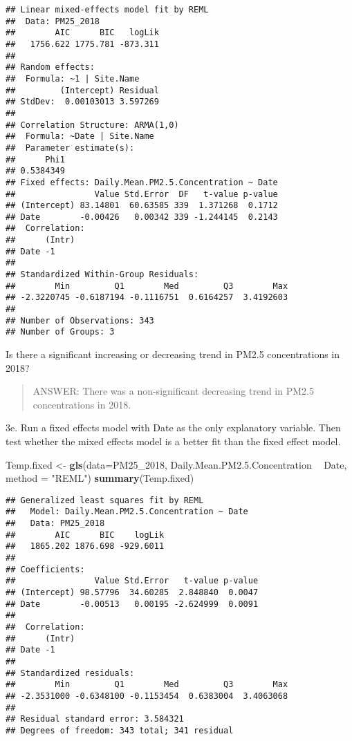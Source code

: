 \documentclass[]{article}
\newenvironment{Shaded}{\begin{snugshade}}{\end{snugshade}}
\newcommand{\KeywordTok}[1]{\textcolor[rgb]{0.13,0.29,0.53}{\textbf{#1}}}
\newcommand{\DataTypeTok}[1]{\textcolor[rgb]{0.13,0.29,0.53}{#1}}
\newcommand{\DecValTok}[1]{\textcolor[rgb]{0.00,0.00,0.81}{#1}}
\newcommand{\FloatTok}[1]{\textcolor[rgb]{0.00,0.00,0.81}{#1}}
\newcommand{\StringTok}[1]{\textcolor[rgb]{0.31,0.60,0.02}{#1}}
\newcommand{\OperatorTok}[1]{\textcolor[rgb]{0.81,0.36,0.00}{\textbf{#1}}}
\newcommand{\NormalTok}[1]{#1}
\begin{document}
\begin{verbatim}
## Linear mixed-effects model fit by REML
##  Data: PM25_2018 
##        AIC      BIC   logLik
##   1756.622 1775.781 -873.311
## 
## Random effects:
##  Formula: ~1 | Site.Name
##         (Intercept) Residual
## StdDev:  0.00103013 3.597269
## 
## Correlation Structure: ARMA(1,0)
##  Formula: ~Date | Site.Name 
##  Parameter estimate(s):
##      Phi1 
## 0.5384349 
## Fixed effects: Daily.Mean.PM2.5.Concentration ~ Date 
##                Value Std.Error  DF   t-value p-value
## (Intercept) 83.14801  60.63585 339  1.371268  0.1712
## Date        -0.00426   0.00342 339 -1.244145  0.2143
##  Correlation: 
##      (Intr)
## Date -1    
## 
## Standardized Within-Group Residuals:
##        Min         Q1        Med         Q3        Max 
## -2.3220745 -0.6187194 -0.1116751  0.6164257  3.4192603 
## 
## Number of Observations: 343
## Number of Groups: 3
\end{verbatim}

Is there a significant increasing or decreasing trend in PM2.5
concentrations in 2018?

\begin{quote}
ANSWER: There was a non-significant decreasing trend in PM2.5
concentrations in 2018.
\end{quote}

3e. Run a fixed effects model with Date as the only explanatory
variable. Then test whether the mixed effects model is a better fit than
the fixed effect model.

\begin{Shaded}
\begin{Highlighting}[]
\NormalTok{Temp.fixed <-}\StringTok{ }\KeywordTok{gls}\NormalTok{(}\DataTypeTok{data=}\NormalTok{PM25_}\DecValTok{2018}\NormalTok{, Daily.Mean.PM2.}\FloatTok{5.}\NormalTok{Concentration }\OperatorTok{~}\StringTok{ }\NormalTok{Date, }\DataTypeTok{method =} \StringTok{"REML"}\NormalTok{)}
\KeywordTok{summary}\NormalTok{(Temp.fixed)}
\end{Highlighting}
\end{Shaded}

\begin{verbatim}
## Generalized least squares fit by REML
##   Model: Daily.Mean.PM2.5.Concentration ~ Date 
##   Data: PM25_2018 
##        AIC      BIC    logLik
##   1865.202 1876.698 -929.6011
## 
## Coefficients:
##                Value Std.Error   t-value p-value
## (Intercept) 98.57796  34.60285  2.848840  0.0047
## Date        -0.00513   0.00195 -2.624999  0.0091
## 
##  Correlation: 
##      (Intr)
## Date -1    
## 
## Standardized residuals:
##        Min         Q1        Med         Q3        Max 
## -2.3531000 -0.6348100 -0.1153454  0.6383004  3.4063068 
## 
## Residual standard error: 3.584321 
## Degrees of freedom: 343 total; 341 residual
\end{verbatim}
\end{document}
